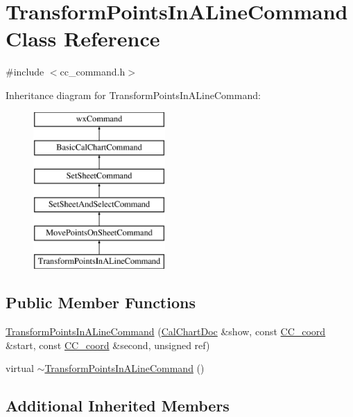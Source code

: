 \hypertarget{a00149}{\section{Transform\-Points\-In\-A\-Line\-Command Class Reference}
\label{a00149}
}


{\ttfamily \#include $<$cc\-\_\-command.\-h$>$}

Inheritance diagram for Transform\-Points\-In\-A\-Line\-Command\-:\begin{figure}[H]
\begin{center}
\leavevmode
\includegraphics[height=6.000000cm]{a00149}
\end{center}
\end{figure}
\subsection*{Public Member Functions}
\begin{DoxyCompactItemize}
\item 
\hyperlink{a00149_afdfb6bed23157f4b5e129114add44360}{Transform\-Points\-In\-A\-Line\-Command} (\hyperlink{a00020}{Cal\-Chart\-Doc} \&show, const \hyperlink{a00029}{C\-C\-\_\-coord} \&start, const \hyperlink{a00029}{C\-C\-\_\-coord} \&second, unsigned ref)
\item 
virtual \hyperlink{a00149_a39357cdfd690220510d29de7f63d6b56}{$\sim$\-Transform\-Points\-In\-A\-Line\-Command} ()
\end{DoxyCompactItemize}
\subsection*{Additional Inherited Members}


